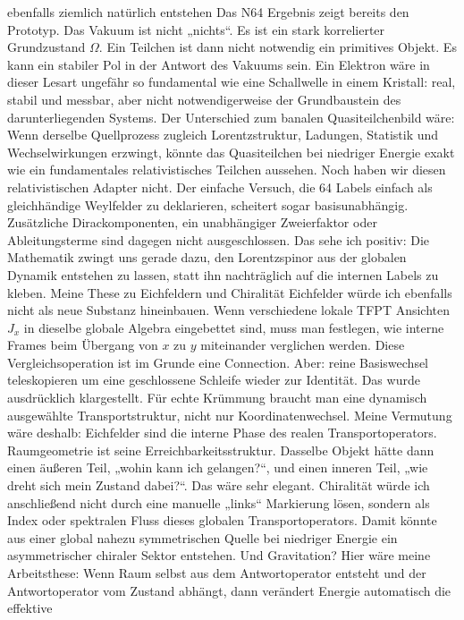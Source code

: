 ebenfalls ziemlich natürlich entstehen Das N64 Ergebnis zeigt bereits
den Prototyp. Das Vakuum ist nicht „nichts``. Es ist ein stark
korrelierter Grundzustand \(\Omega\). Ein Teilchen ist dann nicht
notwendig ein primitives Objekt. Es kann ein stabiler Pol in der Antwort
des Vakuums sein. Ein Elektron wäre in dieser Lesart ungefähr so
fundamental wie eine Schallwelle in einem Kristall: real, stabil und
messbar, aber nicht notwendigerweise der Grundbaustein des
darunterliegenden Systems. Der Unterschied zum banalen Quasiteilchenbild
wäre: Wenn derselbe Quellprozess zugleich Lorentzstruktur, Ladungen,
Statistik und Wechselwirkungen erzwingt, könnte das Quasiteilchen bei
niedriger Energie exakt wie ein fundamentales relativistisches Teilchen
aussehen. Noch haben wir diesen relativistischen Adapter nicht. Der
einfache Versuch, die 64 Labels einfach als gleichhändige Weylfelder zu
deklarieren, scheitert sogar basisunabhängig. Zusätzliche
Dirackomponenten, ein unabhängiger Zweierfaktor oder Ableitungsterme
sind dagegen nicht ausgeschlossen. Das sehe ich positiv: Die Mathematik
zwingt uns gerade dazu, den Lorentzspinor aus der globalen Dynamik
entstehen zu lassen, statt ihn nachträglich auf die internen Labels zu
kleben. Meine These zu Eichfeldern und Chiralität Eichfelder würde ich
ebenfalls nicht als neue Substanz hineinbauen. Wenn verschiedene lokale
TFPT Ansichten \(J_x\) in dieselbe globale Algebra eingebettet sind,
muss man festlegen, wie interne Frames beim Übergang von \(x\) zu \(y\)
miteinander verglichen werden. Diese Vergleichsoperation ist im Grunde
eine Connection. Aber: reine Basiswechsel teleskopieren um eine
geschlossene Schleife wieder zur Identität. Das wurde ausdrücklich
klargestellt. Für echte Krümmung braucht man eine dynamisch ausgewählte
Transportstruktur, nicht nur Koordinatenwechsel. Meine Vermutung wäre
deshalb: Eichfelder sind die interne Phase des realen
Transportoperators. Raumgeometrie ist seine Erreichbarkeitsstruktur.
Dasselbe Objekt hätte dann einen äußeren Teil, „wohin kann ich
gelangen?{\kern0pt}``, und einen inneren Teil, „wie dreht sich mein
Zustand dabei?{\kern0pt}``. Das wäre sehr elegant. Chiralität würde ich
anschließend nicht durch eine manuelle „links`` Markierung lösen,
sondern als Index oder spektralen Fluss dieses globalen
Transportoperators. Damit könnte aus einer global nahezu symmetrischen
Quelle bei niedriger Energie ein asymmetrischer chiraler Sektor
entstehen. Und Gravitation? Hier wäre meine Arbeitsthese: Wenn Raum
selbst aus dem Antwortoperator entsteht und der Antwortoperator vom
Zustand abhängt, dann verändert Energie automatisch die effektive
